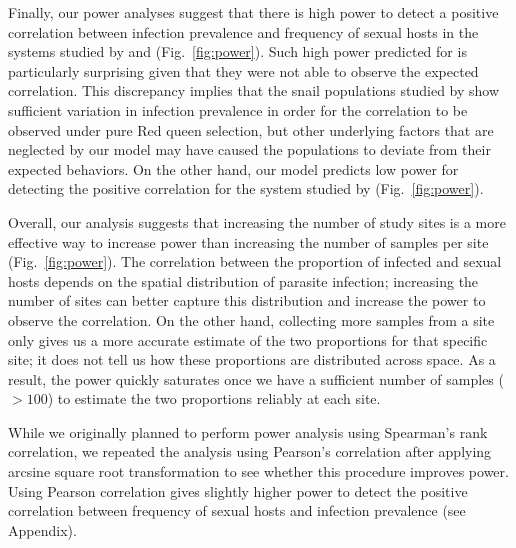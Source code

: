 \documentclass{article}\usepackage[]{graphicx}\usepackage[]{color}
\newcommand{\fref}[1]{Fig.~\ref{fig:#1}}
\begin{document}
Finally, our power analyses suggest that there is high power to detect a positive correlation between infection prevalence and frequency of sexual hosts in the systems studied by \cite{dagan2013clonal} and \cite{mckone2016fine} (\fref{power}).
Such high power predicted for \cite{dagan2013clonal} is particularly surprising given that they were not able to observe the expected correlation.
This discrepancy implies that the snail populations studied by \cite{dagan2013clonal} show sufficient variation in infection prevalence in order for the correlation to be observed under pure Red queen selection, but other underlying factors that are neglected by our model may have caused the populations to deviate from their expected behaviors.
On the other hand, our model predicts low power for detecting the positive correlation for the system studied by \cite{vergara2014infection} (\fref{power}).

Overall, our analysis suggests that increasing the number of study sites is a more effective way to increase power than increasing the number of samples per site (\fref{power}).
The correlation between the proportion of infected and sexual hosts depends on the spatial distribution of parasite infection; 
increasing the number of sites can better capture this distribution and increase the power to observe the correlation.
On the other hand, collecting more samples from a site only gives us a more accurate estimate of the two proportions for that specific site; it does not tell us how these proportions are distributed across space.
As a result, the power quickly saturates once we have a sufficient number of samples ($> 100$) to estimate the two proportions reliably at each site.

While we originally planned to perform power analysis using Spearman's rank correlation,
we repeated the analysis using Pearson's correlation after applying arcsine square root transformation \citep{lively1992parthenogenesis} to see whether this procedure improves power.
Using Pearson correlation gives slightly higher power to detect the positive correlation between frequency of sexual hosts and infection prevalence (see Appendix).
\end{document}
